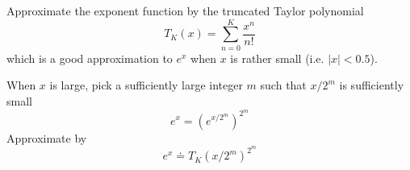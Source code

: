 \documentclass{blog}
\begin{document}
Approximate the exponent function by the truncated Taylor polynomial
\begin{equation}
    T_{K}(x) = \sum_{n=0}^{K} \frac{x^{n}}{n!}
\end{equation}
which is a good approximation to $e^{x}$ when $x$ is rather small (i.e. $|x| < 0.5$).

When $x$ is large, pick a sufficiently large integer $m$ such that $x/2^{m}$ is sufficiently small
\cite{YAIR_2012_SOLVING_PDES_IN_CPP}
\begin{equation}
    e^{x} = ( e^{x/2^{m}} )^{2^{m}}
\end{equation}
Approximate by
\begin{equation}
    e^{x} \doteq T_{K}(x/2^{m})^{2^{m}}
\end{equation}

\begin{definition}
\end{definition}

\begin{definition}
\end{definition}

\begin{definition}
\end{definition}

\printbibliography
\end{document}
